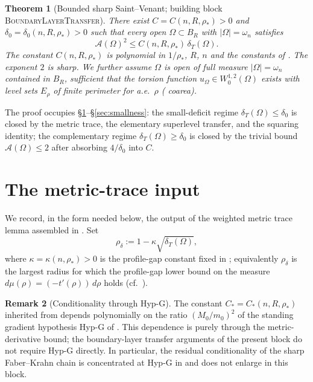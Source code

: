 \documentclass[11pt]{article}
\newtheorem{theorem}{Theorem}[section]
\theoremstyle{definition}
\newtheorem{remark}[theorem]{Remark}
\newcommand{\Fr}{\mathcal{A}}
\newcommand{\Om}{\Omega}
\newcommand{\rstar}{\rho_{*}}
\begin{document}
\begin{theorem}[Bounded sharp Saint--Venant; building block
\textsc{BoundaryLayerTransfer}]\label{thm:main}
There exist
$C=C(n,R,\rstar)>0$ and $\delta_0=\delta_0(n,R,\rstar)>0$ such that
every open $\Om\subset B_R$ with $|\Om|=\omega_n$ satisfies
\begin{equation}\label{eq:main}
\Fr(\Om)^{2}\le C(n,R,\rstar)\,\delta_T(\Om).
\end{equation}
The constant $C(n,R,\rstar)$ is polynomial in $1/\rstar$, $R$, $n$
and the constants of \cite{WeightedMetricTrace}. The exponent $2$ is sharp.
We further assume $\Om$ is open of full measure $|\Om|=\omega_n$
contained in $B_R$, sufficient that the torsion function
$u_\Om\in W^{1,2}_0(\Om)$ exists with level sets $E_\rho$ of finite
perimeter for a.e.\ $\rho$ (\cite{Maggi2012} coarea).
\end{theorem}

The proof occupies \S\ref{sec:setup}--\S\ref{sec:smallness}: the
small-deficit regime $\delta_T(\Om)\le \delta_0$ is closed by the
metric trace, the elementary superlevel transfer, and the
squaring identity; the complementary regime $\delta_T(\Om)\ge\delta_0$
is closed by the trivial bound $\Fr(\Om)\le 2$ after absorbing
$4/\delta_0$ into $C$.

\section{The metric-trace input}\label{sec:setup}

We record, in the form needed below, the output of the weighted
metric trace lemma assembled in \cite{WeightedMetricTrace}. Set
\begin{equation}\label{eq:rho-delta}
\rho_\delta:=1-\kappa\sqrt{\delta_T(\Om)},
\end{equation}
where $\kappa=\kappa(n,\rstar)>0$ is the profile-gap constant fixed
in \cite{LevelSetIdentity}; equivalently
$\rho_\delta$ is the largest radius for which the profile-gap lower
bound on the measure $d\mu(\rho)=(-t'(\rho))\,d\rho$ holds (cf.\
\cite[(5.1)]{LevelSetIdentity}).

\begin{remark}[Conditionality through Hyp-G]\label{rem:hypG}
The constant $C_*=C_*(n,R,\rstar)$ inherited from
\cite[Thm.~1.3]{WeightedMetricTrace} depends polynomially
on the ratio $(M_0/m_0)^2$ of the standing gradient hypothesis
Hyp-G of \cite[\S 7]{LevelSetIdentity}.  This dependence is purely
through the metric-derivative bound; the boundary-layer transfer
arguments of the present block do not require Hyp-G directly.  In
particular, the residual conditionality of the sharp Faber--Krahn
chain is concentrated at Hyp-G in \cite{LevelSetIdentity} and does
not enlarge in this block.
\end{remark}
\end{document}
